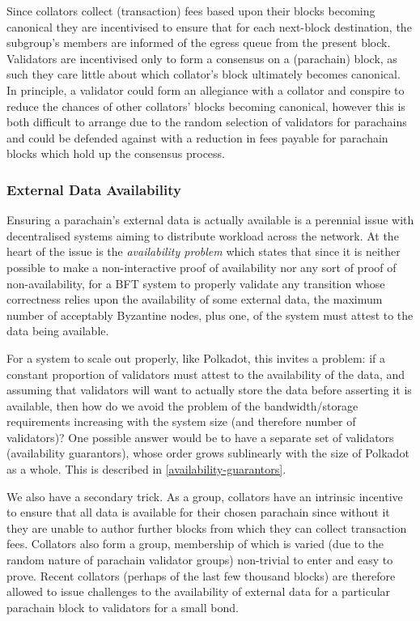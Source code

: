 \documentclass{beamer}
\begin{document}
\begin{frame}
 Since collators collect (transaction) fees based upon their blocks becoming canonical they are incentivised to ensure that for each next-block destination, the subgroup's members are informed of the egress queue from the present block. Validators are incentivised only to form a consensus on a (parachain) block, as such they care little about which collator's block ultimately becomes canonical. In principle, a validator could form an allegiance with a collator and conspire to reduce the chances of other collators' blocks becoming canonical, however this is both difficult to arrange due to the random selection of validators for parachains and could be defended against with a reduction in fees payable for parachain blocks which hold up the consensus process.

\subsubsection{External Data Availability}

 Ensuring a parachain's external data is actually available is a perennial issue with decentralised systems aiming to distribute workload across the network. At the heart of the issue is the \textit{availability problem} which states that since it is neither possible to make a non-interactive proof of availability nor any sort of proof of non-availability, for a BFT system to properly validate any transition whose correctness relies upon the availability of some external data, the maximum number of acceptably Byzantine nodes, plus one, of the system must attest to the data being available.

 For a system to scale out properly, like Polkadot, this invites a problem: if a constant proportion of validators must attest to the availability of the data, and assuming that validators will want to actually store the data before asserting it is available, then how do we avoid the problem of the bandwidth/storage requirements increasing with the system size (and therefore number of validators)? One possible answer would be to have a separate set of validators (availability guarantors), whose order grows sublinearly with the size of Polkadot as a whole. This is described in \ref{availability-guarantors}.

 We also have a secondary trick. As a group, collators have an intrinsic incentive to ensure that all data is available for their chosen parachain since without it they are unable to author further blocks from which they can collect transaction fees. Collators also form a group, membership of which is varied (due to the random nature of parachain validator groups) non-trivial to enter and easy to prove. Recent collators (perhaps of the last few thousand blocks) are therefore allowed to issue challenges to the availability of external data for a particular parachain block to validators for a small bond.


\end{frame}
\end{document}

